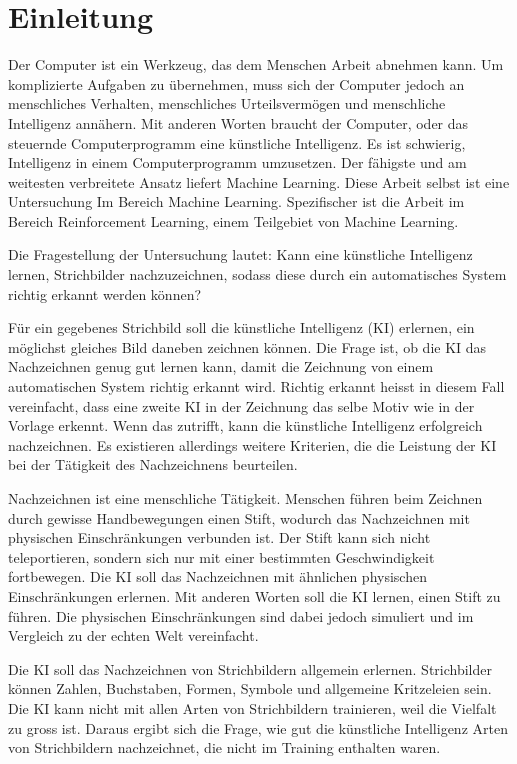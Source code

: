\chapter{Einleitung}
\label{chap:einleit}
Der Computer ist ein Werkzeug, das dem Menschen Arbeit abnehmen kann. Um
komplizierte Aufgaben zu übernehmen, muss sich der Computer jedoch an
menschliches Verhalten, menschliches Urteilsvermögen und menschliche Intelligenz
annähern. Mit anderen Worten braucht der Computer, oder das steuernde
Computerprogramm eine künstliche Intelligenz. Es ist schwierig, Intelligenz in
einem Computerprogramm umzusetzen. Der fähigste und am weitesten verbreitete
Ansatz liefert Machine Learning. Diese Arbeit selbst ist eine Untersuchung Im
Bereich Machine Learning. Spezifischer ist die Arbeit im Bereich Reinforcement
Learning, einem Teilgebiet von Machine Learning.

Die Fragestellung der Untersuchung lautet: Kann eine künstliche Intelligenz
lernen, Strichbilder nachzuzeichnen, sodass diese durch ein automatisches System
richtig erkannt werden können?

Für ein gegebenes Strichbild soll die künstliche Intelligenz (KI) erlernen, ein
möglichst gleiches Bild daneben zeichnen können. Die Frage ist, ob die KI das
Nachzeichnen genug gut lernen kann, damit die Zeichnung von einem automatischen
System richtig erkannt wird. Richtig erkannt heisst in diesem Fall vereinfacht,
dass eine zweite KI in der Zeichnung das selbe Motiv wie in der Vorlage erkennt.
Wenn das zutrifft, kann die künstliche Intelligenz erfolgreich nachzeichnen. Es
existieren allerdings weitere Kriterien, die die Leistung der KI bei der
Tätigkeit des Nachzeichnens beurteilen.

Nachzeichnen ist eine menschliche Tätigkeit. Menschen führen beim Zeichnen durch
gewisse Handbewegungen einen Stift, wodurch das Nachzeichnen mit physischen
Einschränkungen verbunden ist. Der Stift kann sich nicht teleportieren, sondern
sich nur mit einer bestimmten Geschwindigkeit fortbewegen. Die KI soll das
Nachzeichnen mit ähnlichen physischen Einschränkungen erlernen. Mit anderen
Worten soll die KI lernen, einen Stift zu führen.  Die
physischen Einschränkungen sind dabei jedoch simuliert und im Vergleich zu der
echten Welt vereinfacht. 

Die KI soll das Nachzeichnen von Strichbildern allgemein erlernen. Strichbilder
können Zahlen, Buchstaben, Formen, Symbole und allgemeine Kritzeleien sein. Die
KI kann nicht mit allen Arten von Strichbildern trainieren, weil die Vielfalt zu
gross ist. Daraus ergibt sich die Frage, wie gut die künstliche Intelligenz
Arten von Strichbildern nachzeichnet, die nicht im Training enthalten waren.

